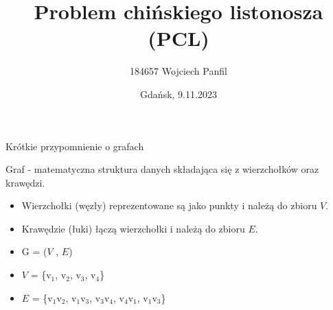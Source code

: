 \documentclass[polish,envcountsect,10pt]{beamer}
\title{Problem chińskiego listonosza (PCL)}
\author{184657 Wojciech Panfil}
\date{Gdańsk, 9.11.2023}
\begin{document}
\frame{\titlepage}

\begin{frame}{Krótkie przypomnienie o grafach}

Graf - matematyczna struktura danych składająca się z wierzchołków oraz krawędzi.
\medskip
\begin{itemize}
    \item Wierzchołki (węzły) reprezentowane są jako punkty i należą do zbioru $V$.
    \item Krawędzie (łuki) łączą wierzchołki i należą do zbioru $E$.
\end{itemize}

\begin{center}


\end{center}

\begin{itemize}
    \item G = ($V$ , $E$)
    \item $V$ = \{v$_1$, v$_2$, v$_3$, v$_4$\}
    \item $E$ = \{v$_1$v$_2$, v$_1$v$_3$, v$_3$v$_4$, v$_4$v$_1$, v$_1$v$_3$\}
\end{itemize}

\end{frame}
\end{document}
